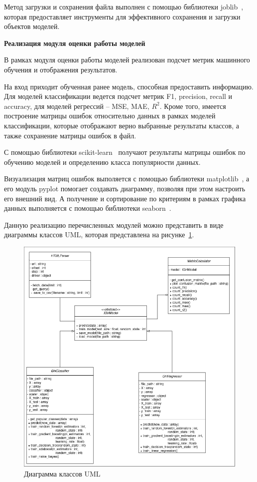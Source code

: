 Метод загрузки и сохранения файла выполнен с помощью библиотеки joblib~\cite{joblib}, которая предоставляет инструменты для эффективного сохранения и загрузки объектов моделей.

\textbf{Реализация модуля оценки работы моделей}

В рамках модуля оценки работы моделей реализован подсчет метрик машинного обучения и отображения результатов.

На вход приходит обученная ранее модель, способная предоставить информацию. Для моделей классификации ведется подсчет метрик F1, precision, recall и accuracy, для моделей регрессий -- MSE, MAE, $R^2$. Кроме того, имеется построение матрицы ошибок относительно данных в рамках моделей классификации, которые отображают верно выбранные результаты классов, а также сохранение матрицы ошибок в файл.

С помощью библиотеки scikit-learn~\cite{sklearn} получают результаты матрицы ошибок по обучению моделей и определению класса популярности данных.

Визуализация матриц ошибок выполяется с помощью библиотеки matplotlib~\cite{matplotlib}, а его модуль pyplot помогает создавать диаграмму,  позволяя при этом настроить его внешний вид. А получение и сортирование по критериям в рамках графика данных выполняется с помощью библиотеки seaborn~\cite{seaborn}.

Данную реализацию перечисленных модулей можно представить в виде диаграммы классов UML, которая представлена на рисунке~\ref{ris:uml}.

\begin{figure}[h]
    \centering
    \includegraphics[width=1\linewidth]{pic/uml.png}
    \vspace{-0.5em}    \caption{Диаграмма классов UML}
    \label{ris:uml}
\end{figure}
\vspace{1em}


